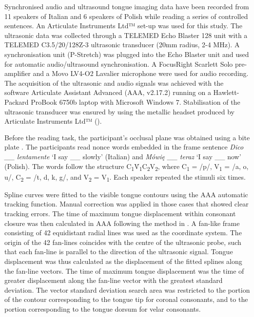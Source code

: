 \documentclass[11pt,]{article}
\begin{document}
Synchronised audio and ultrasound tongue imaging data have been recorded
from 11 speakers of Italian and 6 speakers of Polish while reading a
series of controlled sentences. An Articulate Instruments Ltd™ set-up
was used for this study. The ultrasonic data was collected through a
TELEMED Echo Blaster 128 unit with a TELEMED C3.5/20/128Z-3 ultrasonic
transducer (20mm radius, 2-4 MHz). A synchronisation unit (P-Stretch)
was plugged into the Echo Blaster unit and used for automatic
audio/ultrasound synchronisation. A FocusRight Scarlett Solo
pre-amplifier and a Movo LV4-O2 Lavalier microphone were used for audio
recording. The acquisition of the ultrasonic and audio signals was
achieved with the software Articulate Assistant Advanced (AAA, v2.17.2)
running on a Hawlett-Packard ProBook 6750b laptop with Microsoft Windows
7. Stabilisation of the ultrasonic transducer was ensured by using the
metallic headset produced by Articulate Instruments Ltd™
(\citeyear{articulate2008}).

Before the reading task, the participant's occlusal plane was obtained
using a bite plate \citep{scobbie2011}. The participants read nonce
words embedded in the frame sentence \emph{Dico \_\_ lentamente} `I say
\_\_ slowly' (Italian) and \emph{Mówię \_\_ teraz} `I say \_\_ now'
(Polish). The words follow the structure
C\textsubscript{1}V́\textsubscript{1}C\textsubscript{2}V\textsubscript{2},
where C\textsubscript{1} = /p/, V\textsubscript{1} = /a, o, u/,
C\textsubscript{2} = /t, d, k, g/, and V\textsubscript{2} =
V\textsubscript{1}. Each speaker repeated the stimuli six times.

Spline curves were fitted to the visible tongue contours using the AAA
automatic tracking function. Manual correction was applied in those
cases that showed clear tracking errors. The time of maximum tongue
displacement within consonant closure was then calculated in AAA
following the method in \citet{strycharczuk2015}. A fan-like frame
consisting of 42 equidistant radial lines was used as the coordinate
system. The origin of the 42 fan-lines coincides with the centre of the
ultrasonic probe, such that each fan-line is parallel to the direction
of the ultrasonic signal. Tongue displacement was thus calculated as the
displacement of the fitted splines along the fan-line vectors. The time
of maximum tongue displacement was the time of greater displacement
along the fan-line vector with the greatest standard deviation. The
vector standard deviation search area was restricted to the portion of
the contour corresponding to the tongue tip for coronal consonants, and
to the portion corresponding to the tongue dorsum for velar consonants.
\end{document}
